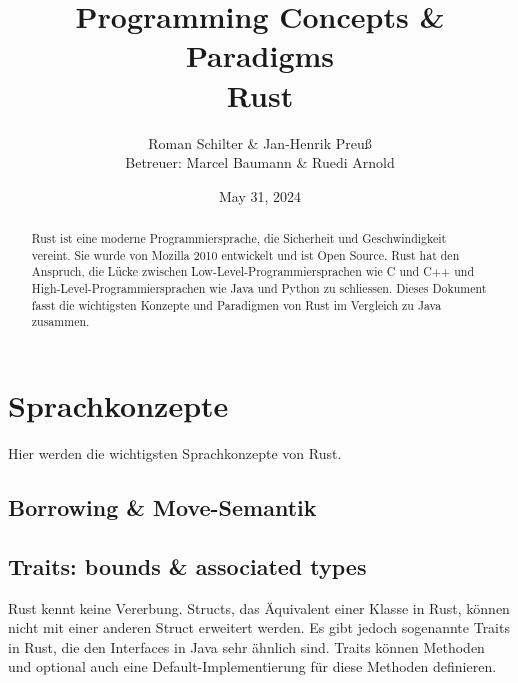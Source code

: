 \documentclass[letterpaper,12pt]{article}
\begin{document}
    \title{Programming Concepts \& Paradigms\\Rust}
    \author{Roman Schilter \& Jan-Henrik Preuß\\[0.4cm]{\small Betreuer: Marcel Baumann \& Ruedi Arnold}}
    \date{May 31, 2024}
    \maketitle


    \begin{abstract}
        Rust ist eine moderne Programmiersprache, die Sicherheit und Geschwindigkeit vereint.
        Sie wurde von Mozilla 2010 entwickelt und ist Open Source.
        Rust hat den Anspruch, die Lücke zwischen Low-Level-Programmiersprachen wie C und C++ und High-Level-Programmiersprachen wie Java und Python zu schliessen.
        Dieses Dokument fasst die wichtigsten Konzepte und Paradigmen von Rust im Vergleich zu Java zusammen.
    \end{abstract}



    \section{Sprachkonzepte}

    Hier werden die wichtigsten Sprachkonzepte von Rust.

    \blindtext %

    \subsection{Borrowing \& Move-Semantik}\label{subsec:borrowing-&-move-semantik}

    \subsection{Traits: bounds \& associated types}\label{subsec:traits:-bounds-&-associated-types}
    Rust kennt keine Vererbung.
    Structs, das Äquivalent einer Klasse in Rust, können nicht mit einer anderen Struct erweitert werden.
    Es gibt jedoch sogenannte Traits in Rust, die den Interfaces in Java sehr ähnlich sind.
    Traits können Methoden und optional auch eine Default-Implementierung für diese Methoden definieren.
\end{document}
